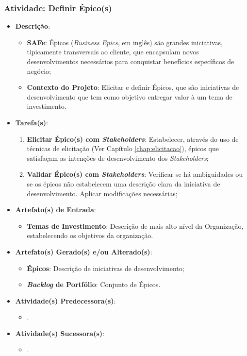 			\subsubsection[Atividade: Definir Épico(s)]{Atividade: Definir Épico(s)}
			\label{subsubsec:processo_atividade_portfolio_definir_epico}
				\begin{itemize}
					\item{\textbf{Descrição}:
						\begin{itemize}
							\item{\textbf{SAFe}: Épicos (\emph{Business Epics}, em inglês) são grandes iniciativas, tipicamente transversais ao cliente, que encapsulam novos desenvolvimentos necessários para conquistar benefícios específicos de negócio;}
							\item{\textbf{Contexto do Projeto}: Elicitar e definir Épicos, que são iniciativas de desenvolvimento que tem como objetivo entregar valor à um tema de investimento.}
						\end{itemize}}
					\item{\textbf{Tarefa(s)}:
						\begin{enumerate}
							\item{\textbf{Elicitar Épico(s) com \emph{Stakeholders}}: Estabelecer, através do uso de técnicas de elicitação (Ver Capítulo \ref{chap:elicitacao}), épicos que satisfaçam as intenções de desenvolvimento dos \emph{Stakeholders};}
							\item{\textbf{Validar Épico(s) com \emph{Stakeholders}}: Verificar se há ambiguidades ou se os épicos não estabelecem uma descrição clara da iniciativa de desenvolvimento. Aplicar modificações necessárias;}
						\end{enumerate}}
					\item{\textbf{Artefato(s) de Entrada}:
						\begin{itemize}
							\item{\textbf{Temas de Investimento}: Descrição de mais alto nível da Organização, estabelecendo os objetivos da organização.}
						\end{itemize}}
					\item{\textbf{Artefato(s) Gerado(s) e/ou Alterado(s)}:
						\begin{itemize}
							\item{\textbf{Épicos}: Descrição de iniciativas de desenvolvimento;}
							\item{\textbf{\emph{Backlog} de Portfólio}: Conjunto de Épicos.}
						\end{itemize}}
					\item{\textbf{Atividade(s) Predecessora(s)}:
						\begin{itemize}
							\item{.}
						\end{itemize}}
					\item{\textbf{Atividade(s) Sucessora(s)}:
						\begin{itemize}
							\item{.}
						\end{itemize}}
				\end{itemize}

